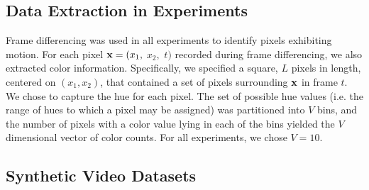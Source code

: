 \documentclass[twocolumn, final]{svjour3}
\begin{document}
\subsection{Data Extraction in Experiments}
\label{sec:dataextractioninexperiments}

Frame differencing was used in all experiments to identify pixels exhibiting motion. 
For each pixel $\bold{x} = ( x_{1},$ $x_{2},$ $t )$ recorded during frame differencing, we also extracted color information. Specifically, we specified a square, $L$ pixels in length, centered on $(x_{1}, x_{2})$, that contained a set of pixels surrounding $\bold{x}$ in frame $t$. We chose to capture the hue for each pixel. The set of possible hue values (i.e. the range of hues to which a pixel may be assigned) was partitioned into $V$ bins, and the number of pixels with a color value lying in each of the bins yielded the $V$ dimensional vector of color counts. For all experiments, we chose $V=10$.



\subsection{Synthetic Video Datasets}
\label{sec:syntheticvideodatasets}
\end{document}
